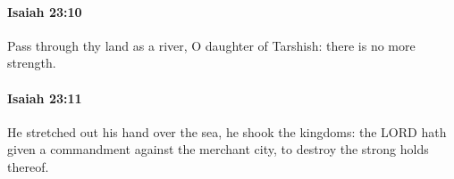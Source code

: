 		\paragraph{Isaiah 23:10} %
			\label{ISAIAH-23-10}

			Pass through thy land as a river, O daughter of Tarshish: there is no more strength.


		\paragraph{Isaiah 23:11} %
			\label{ISAIAH-23-11}

			He stretched out his hand over the sea, he shook the kingdoms: the LORD hath given a commandment against the merchant city, to destroy the strong holds thereof.


